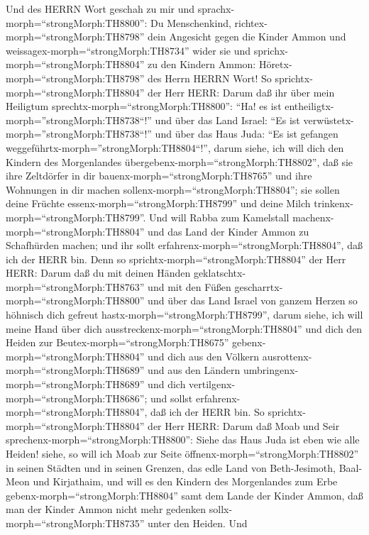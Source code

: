  Und des HERRN Wort geschah zu mir und
sprachx-morph=``strongMorph:TH8800'':  Du Menschenkind,
richtex-morph=``strongMorph:TH8798'' dein Angesicht gegen die Kinder
Ammon und weissagex-morph=``strongMorph:TH8734'' wider sie 
und sprichx-morph=``strongMorph:TH8804'' zu den Kindern Ammon:
Höretx-morph=``strongMorph:TH8798'' des Herrn HERRN Wort! So
sprichtx-morph=``strongMorph:TH8804'' der Herr HERR: Darum daß ihr über
mein Heiligtum sprechtx-morph=``strongMorph:TH8800'': ``Ha! es ist
entheiligtx-morph=''strongMorph:TH8738``!'' und über das Land Israel:
``Es ist verwüstetx-morph=''strongMorph:TH8738``!'' und über das Haus
Juda: ``Es ist gefangen weggeführtx-morph=''strongMorph:TH8804``!'',
 darum siehe, ich will dich den Kindern des Morgenlandes
übergebenx-morph=``strongMorph:TH8802'', daß sie ihre Zeltdörfer in dir
bauenx-morph=``strongMorph:TH8765'' und ihre Wohnungen in dir machen
sollenx-morph=``strongMorph:TH8804''; sie sollen deine Früchte
essenx-morph=``strongMorph:TH8799'' und deine Milch
trinkenx-morph=``strongMorph:TH8799''.  Und will Rabba zum
Kamelstall machenx-morph=``strongMorph:TH8804'' und das Land der Kinder
Ammon zu Schafhürden machen; und ihr sollt
erfahrenx-morph=``strongMorph:TH8804'', daß ich der HERR bin.
 Denn so sprichtx-morph=``strongMorph:TH8804'' der Herr
HERR: Darum daß du mit deinen Händen
geklatschtx-morph=``strongMorph:TH8763'' und mit den Füßen
gescharrtx-morph=``strongMorph:TH8800'' und über das Land Israel von
ganzem Herzen so höhnisch dich gefreut
hastx-morph=``strongMorph:TH8799'',  darum siehe, ich will
meine Hand über dich ausstreckenx-morph=``strongMorph:TH8804'' und dich
den Heiden zur Beutex-morph=``strongMorph:TH8675''
gebenx-morph=``strongMorph:TH8804'' und dich aus den Völkern
ausrottenx-morph=``strongMorph:TH8689'' und aus den Ländern
umbringenx-morph=``strongMorph:TH8689'' und dich
vertilgenx-morph=``strongMorph:TH8686''; und sollst
erfahrenx-morph=``strongMorph:TH8804'', daß ich der HERR bin.
 So sprichtx-morph=``strongMorph:TH8804'' der Herr HERR:
Darum daß Moab und Seir sprechenx-morph=``strongMorph:TH8800'': Siehe
das Haus Juda ist eben wie alle Heiden!  siehe, so will ich
Moab zur Seite öffnenx-morph=``strongMorph:TH8802'' in seinen Städten
und in seinen Grenzen, das edle Land von Beth-Jesimoth, Baal-Meon und
Kirjathaim,  und will es den Kindern des Morgenlandes zum
Erbe gebenx-morph=``strongMorph:TH8804'' samt dem Lande der Kinder
Ammon, daß man der Kinder Ammon nicht mehr gedenken
sollx-morph=``strongMorph:TH8735'' unter den Heiden.  Und
